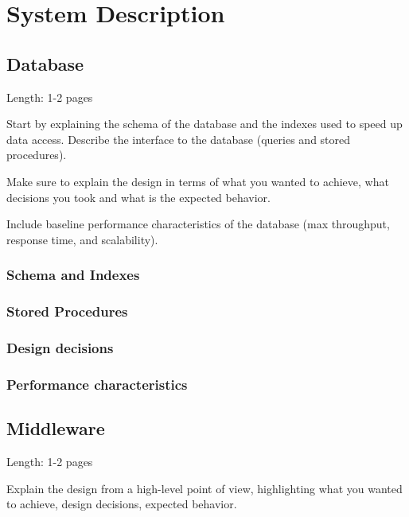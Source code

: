 \documentclass[11pt]{article}
\begin{document}
\section{System Description}\label{sec:system-description}

\subsection{Database}\label{sec:database}

Length: 1-2 pages

Start by explaining the schema of the database and the indexes used to
speed up data access. Describe the interface to the database (queries
and stored procedures).

Make sure to explain the design in terms of what you wanted to achieve,
what decisions you took and what is the expected behavior.

Include baseline performance characteristics of the database (max
throughput, response time, and scalability).

\subsubsection{Schema and Indexes}\label{sec:schema-and-indexes}

\subsubsection{Stored Procedures}\label{sec:stored-procedures}

\subsubsection{Design decisions}\label{sec:design-decisions}

\subsubsection{Performance characteristics}\label{sec:performance-characteristic
s}

\subsection{Middleware}\label{sec:middleware}

Length: 1-2 pages

Explain the design from a high-level point of view, highlighting what
you wanted to achieve, design decisions, expected behavior.
\end{document}
